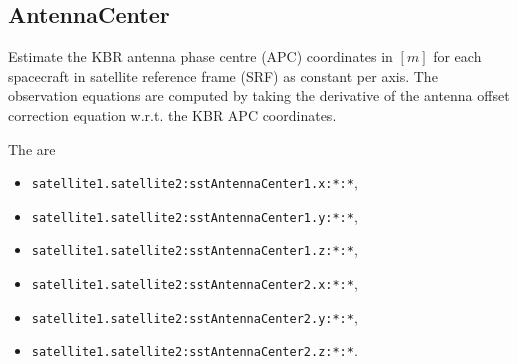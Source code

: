 \subsection{AntennaCenter}\label{parametrizationSatelliteTrackingType:antennaCenter}
Estimate the KBR antenna phase centre (APC) coordinates in $[m]$ for each spacecraft in satellite reference frame (SRF)
as constant per axis. The observation equations are computed by taking the derivative
of the antenna offset correction equation w.r.t. the KBR APC coordinates.

The  are
\begin{itemize}
\item \verb|satellite1.satellite2:sstAntennaCenter1.x:*:*|,
\item \verb|satellite1.satellite2:sstAntennaCenter1.y:*:*|,
\item \verb|satellite1.satellite2:sstAntennaCenter1.z:*:*|,
\item \verb|satellite1.satellite2:sstAntennaCenter2.x:*:*|,
\item \verb|satellite1.satellite2:sstAntennaCenter2.y:*:*|,
\item \verb|satellite1.satellite2:sstAntennaCenter2.z:*:*|.
\end{itemize}



